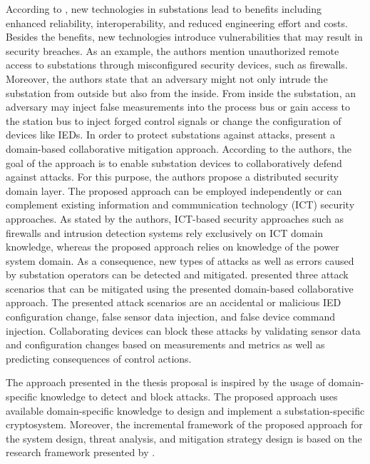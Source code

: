 According to \citeauthor{Hong2019} \cite{Hong2019}, new technologies in substations lead to benefits including enhanced reliability, interoperability, and reduced engineering effort and costs.
Besides the benefits, new technologies introduce vulnerabilities that may result in security breaches.
As an example, the authors mention unauthorized remote access to substations through misconfigured security devices, such as firewalls.
Moreover, the authors state that an adversary might not only intrude the substation from outside but also from the inside.
From inside the substation, an adversary may inject false measurements into the process bus or gain access to the station bus to inject forged control signals or change the configuration of devices like IEDs.
In order to protect substations against attacks, \citeauthor{Hong2019} present a domain-based collaborative mitigation approach.
According to the authors, the goal of the approach is to enable substation devices to collaboratively defend against attacks.
For this purpose, the authors propose a distributed security domain layer.
The proposed approach can be employed independently or can complement existing information and communication technology (ICT) security approaches.
As stated by the authors, ICT-based security approaches such as firewalls and intrusion detection systems rely exclusively on ICT domain knowledge, whereas the proposed approach relies on knowledge of the power system domain.
As a consequence, new types of attacks as well as errors caused by substation operators can be detected and mitigated.
\citeauthor{Hong2019} presented three attack scenarios that can be mitigated using the presented domain-based collaborative approach.
The presented attack scenarios are an accidental or malicious IED configuration change, false sensor data injection, and false device command injection.
Collaborating devices can block these attacks by validating sensor data and configuration changes based on measurements and metrics as well as predicting consequences of control actions.

The approach presented in the thesis proposal is inspired by the usage of domain-specific knowledge to detect and block attacks.
The proposed approach uses available domain-specific knowledge to design and implement a substation-specific cryptosystem.
Moreover, the incremental framework of the proposed approach for the system design, threat analysis, and mitigation strategy design is based on the research framework presented by \citeauthor{Hong2019}.

